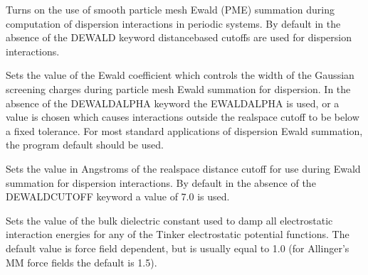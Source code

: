 \documentclass[letterpaper,11pt,english]{sphinxmanual}
\begin{document}
\ignorespaces {}\label{\detokenize{text/keywords:key-dewald}}\begin{description}
\sphinxAtStartPar
Turns on the use of smooth particle mesh Ewald (PME) summation during computation of dispersion interactions in periodic systems. By default in the absence of the DEWALD keyword distance\sphinxhyphen{}based cutoffs are used for dispersion interactions.

\end{description}

\ignorespaces {}\label{\detokenize{text/keywords:key-dewald-alpha}}\begin{description}
\sphinxAtStartPar
Sets the value of the Ewald coefficient which controls the width of the Gaussian screening charges during particle mesh Ewald summation for dispersion. In the absence of the DEWALD\sphinxhyphen{}ALPHA keyword the EWALD\sphinxhyphen{}ALPHA is used, or a value is chosen which causes interactions outside the real\sphinxhyphen{}space cutoff to be below a fixed tolerance. For most standard applications of dispersion Ewald summation, the program default should be used.

\end{description}

\ignorespaces {}\label{\detokenize{text/keywords:key-dewald-cutoff}}\begin{description}
\sphinxAtStartPar
Sets the value in Angstroms of the real\sphinxhyphen{}space distance cutoff for use during Ewald summation for dispersion interactions. By default in the absence of the DEWALD\sphinxhyphen{}CUTOFF keyword a value of 7.0 is used.

\end{description}

\ignorespaces {}\label{\detokenize{text/keywords:key-dielectric}}\begin{description}
\sphinxAtStartPar
Sets the value of the bulk dielectric constant used to damp all electrostatic interaction energies for any of the Tinker electrostatic potential functions. The default value is force field dependent, but is usually equal to 1.0 (for Allinger’s MM force fields the default is 1.5).

\end{description}
\end{document}
